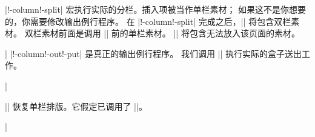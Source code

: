 {{%
|\@double!-column!-split| 宏执行实际的分栏。插入项被当作单栏素材；
如果这不是你想要的，你需要修改输出例行程序。
在 |\@double!-column!-split| 完成之后，|| 将包含双栏素材。
双栏素材前面是调用 |\doublecolumns| 前的单栏素材。
|| 将包含无法放入该页面的素材。

\csdisplay
\def\@doublecolumnsplit{%
   \splittopskip = \topskip \splitmaxdepth = \maxdepth
   \dimen0 = \singlecolumnvsize
      \advance\dimen0 by -\ht\@partialpage
      \advance\dimen0 by -\ht\footins
      \advance\dimen0 by -\skip\footins
      \advance\dimen0 by -\ht\topins
   \begingroup
      \vbadness = 10000
      \global\setbox1=\vsplit255 to \dimen0 \wd1=\hsize
      \global\setbox3=\vsplit255 to \dimen0 \wd3=\hsize
   \endgroup
   \global\setbox4=\vbox{\unvbox255
      \penalty\outputpenalty}%
   \global\setbox255=\vbox{\unvbox\@partialpage
      \hbox to \singlecolumnhsize{\box1\hfil\box3}%
      \vfill}}%
|
\needspace{.5in}
|\double!-column!-out!-put| 是真正的输出例行程序。
我们调用 |\output| 执行实际的盒子送出工作。

\csdisplay
\def\doublecolumnoutput{\@doublecolumnsplit
   \hsize = \singlecolumnhsize \vsize = \singlecolumnvsize
   \previousoutput \unvbox4}%
|

|\singlecolumn| 恢复单栏排版。它假定已调用了 |\doublecolumns|。

\csdisplay
\def\singlecolumn{\par %
   \output = {\global\setbox1 =
      \vbox{\unvbox255\vskip\abovedoublecolumnskip}}%
   \pagegoal = \pagetotal \break \setbox255 = \box1
   {\singlecolumnvsize = \ht255
      \divide\singlecolumnvsize by 2
      \advance\singlecolumnvsize by +\ht\@partialpage
      \advance\singlecolumnvsize by +\ht\footins
      \advance\singlecolumnvsize by +\skip\footins
      \advance\singlecolumnvsize by +\ht\topins
   \@doublecolumnsplit}%
   \hsize = \singlecolumnhsize
   \vsize = \singlecolumnvsize
   \output = \expandafter{\the\previousoutput}%
   \unvbox255}%
|

}}
